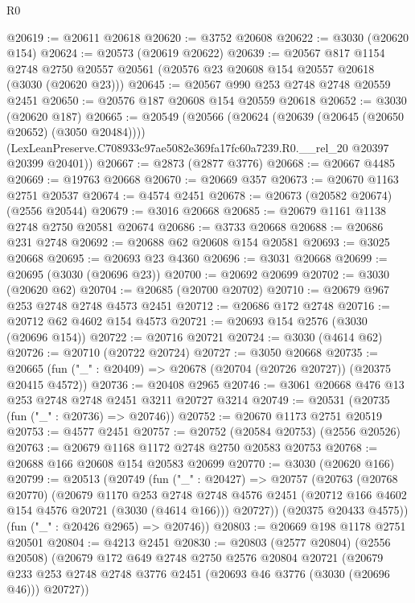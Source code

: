 \begin{lexlean}{R0}
\begin{coremodule}
@20619 := @20611 @20618
@20620 := @3752 @20608
@20622 := @3030 (@20620 @154)
@20624 := @20573 (@20619 @20622)
@20639 := @20567
    @817
    @1154
    @2748
    @2750
    @20557
    @20561
    (@20576 @23 @20608 @154 @20557 @20618 (@3030 (@20620 @23)))
@20645 := @20567 @990 @253 @2748 @2748 @20559 @2451
@20650 := @20576 @187 @20608 @154 @20559 @20618
@20652 := @3030 (@20620 @187)
@20665 := @20549
    (@20566
      (@20624 (@20639 (@20645 (@20650 @20652) (@3050 @20484))))
      (LexLeanPreserve.C708933c97ae5082e369fa17fc60a7239.R0.__rel_20 @20397 @20399 @20401))
@20667 := @2873 (@2877 @3776)
@20668 := @20667 @4485
@20669 := @19763 @20668
@20670 := @20669 @357
@20673 := @20670 @1163 @2751 @20537
@20674 := @4574 @2451
@20678 := @20673 (@20582 @20674) (@2556 @20544)
@20679 := @3016 @20668
@20685 := @20679 @1161 @1138 @2748 @2750 @20581 @20674
@20686 := @3733 @20668
@20688 := @20686 @231 @2748
@20692 := @20688 @62 @20608 @154 @20581
@20693 := @3025 @20668
@20695 := @20693 @23 @4360
@20696 := @3031 @20668
@20699 := @20695 (@3030 (@20696 @23))
@20700 := @20692 @20699
@20702 := @3030 (@20620 @62)
@20704 := @20685 (@20700 @20702)
@20710 := @20679 @967 @253 @2748 @2748 @4573 @2451
@20712 := @20686 @172 @2748
@20716 := @20712 @62 @4602 @154 @4573
@20721 := @20693 @154 @2576 (@3030 (@20696 @154))
@20722 := @20716 @20721
@20724 := @3030 (@4614 @62)
@20726 := @20710 (@20722 @20724)
@20727 := @3050 @20668
@20735 := @20665 (fun ("_" : @20409) => @20678 (@20704 (@20726 @20727)) (@20375 @20415 @4572))
@20736 := @20408 @2965
@20746 := @3061 @20668 @476 @13 @253 @2748 @2748 @2451 @3211 @20727 @3214
@20749 := @20531 (@20735 (fun ("_" : @20736) => @20746))
@20752 := @20670 @1173 @2751 @20519
@20753 := @4577 @2451
@20757 := @20752 (@20584 @20753) (@2556 @20526)
@20763 := @20679 @1168 @1172 @2748 @2750 @20583 @20753
@20768 := @20688 @166 @20608 @154 @20583 @20699
@20770 := @3030 (@20620 @166)
@20799 := @20513
    (@20749
      (fun ("_" : @20427) =>
      @20757
        (@20763
          (@20768 @20770)
          (@20679
            @1170
            @253
            @2748
            @2748
            @4576
            @2451
            (@20712 @166 @4602 @154 @4576 @20721 (@3030 (@4614 @166)))
            @20727))
        (@20375 @20433 @4575))
      (fun ("_" : @20426 @2965) => @20746))
@20803 := @20669 @198 @1178 @2751 @20501
@20804 := @4213 @2451
@20830 := @20803
    (@2577 @20804)
    (@2556 @20508)
    (@20679
      @172
      @649
      @2748
      @2750
      @2576
      @20804
      @20721
      (@20679 @233 @253 @2748 @2748 @3776 @2451 (@20693 @46 @3776 (@3030 (@20696 @46))) @20727))

\end{coremodule}
\end{lexlean}
